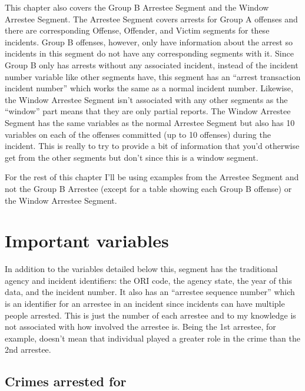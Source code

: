\documentclass[
  12pt,
  openany]{book}
\begin{document}
This chapter also covers the Group B Arrestee Segment and the Window Arrestee Segment. The Arrestee Segment covers arrests for Group A offenses and there are corresponding Offense, Offender, and Victim segments for these incidents. Group B offenses, however, only have information about the arrest so incidents in this segment do not have any corresponding segments with it. Since Group B only has arrests without any associated incident, instead of the incident number variable like other segments have, this segment has an ``arrest transaction incident number'' which works the same as a normal incident number. Likewise, the Window Arrestee Segment isn't associated with any other segments as the ``window'' part means that they are only partial reports. The Window Arrestee Segment has the same variables as the normal Arrestee Segment but also has 10 variables on each of the offenses committed (up to 10 offenses) during the incident. This is really to try to provide a bit of information that you'd otherwise get from the other segments but don't since this is a window segment.

For the rest of this chapter I'll be using examples from the Arrestee Segment and not the Group B Arrestee (except for a table showing each Group B offense) or the Window Arrestee Segment.

\hypertarget{important-variables-4}{%
\section{Important variables}\label{important-variables-4}}

In addition to the variables detailed below this, segment has the traditional agency and incident identifiers: the ORI code, the agency state, the year of this data, and the incident number. It also has an ``arrestee sequence number'' which is an identifier for an arrestee in an incident since incidents can have multiple people arrested. This is just the number of each arrestee and to my knowledge is not associated with how involved the arrestee is. Being the 1st arrestee, for example, doesn't mean that individual played a greater role in the crime than the 2nd arrestee.

\hypertarget{crimes-arrested-for}{%
\subsection{Crimes arrested for}\label{crimes-arrested-for}}
\end{document}
